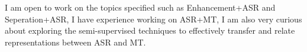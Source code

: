 I am open to work on the topics specified such as Enhancement+ASR and Seperation+ASR, I have experience working  on ASR+MT, I am also  very curious about exploring the semi-supervised techniques to effectively transfer and relate representations between ASR and MT.
